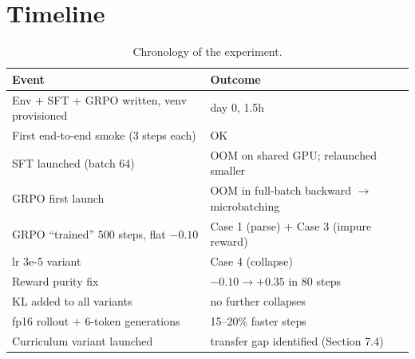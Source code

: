 \documentclass[11pt]{article}
\begin{document}
\section{Timeline}
\begin{table}[H]
\centering
\small
\begin{tabular}{ll}
\toprule
Event & Outcome \\
\midrule
Env + SFT + GRPO written, venv provisioned & day 0, 1.5h \\
First end-to-end smoke (3 steps each) & OK \\
SFT launched (batch 64) & OOM on shared GPU; relaunched smaller \\
GRPO first launch & OOM in full-batch backward $\to$ microbatching \\
GRPO ``trained'' 500 steps, flat $-0.10$ & Case 1 (parse) + Case 3 (impure reward) \\
lr 3e-5 variant & Case 4 (collapse) \\
Reward purity fix & $-0.10 \to +0.35$ in 80 steps \\
KL added to all variants & no further collapses \\
fp16 rollout + 6-token generations & 15--20\% faster steps \\
Curriculum variant launched & transfer gap identified (Section 7.4) \\
\bottomrule
\end{tabular}
\caption{Chronology of the experiment.}
\end{table}
\end{document}
